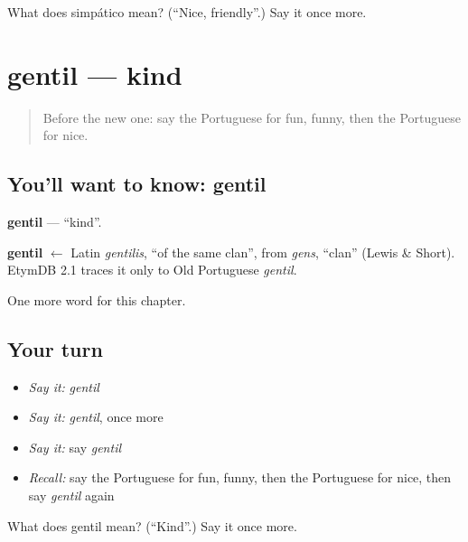 \begin{tcolorbox}[breakable,colback=teal!4,colframe=teal!35!black,title={Before you move on}]
What does simpático mean? (\textquotedblleft{}Nice, friendly\textquotedblright{}.) Say it once more.
\end{tcolorbox}
\section[gentil]{gentil — kind}

\label{lesson:PT-C124-gentil}



\begin{quote}
Before the new one: say the Portuguese for fun, funny, then the Portuguese for nice.
\end{quote}

\subsection*{You'll want to know: gentil}
\textbf{gentil} — \textquotedblleft{}kind\textquotedblright{}.

\begin{cousinweb}
\textbf{gentil} $\leftarrow$ Latin \emph{gentilis}, \textquotedblleft{}of the same clan\textquotedblright{}, from \emph{gens}, \textquotedblleft{}clan\textquotedblright{} (Lewis \& Short). EtymDB 2.1 traces it only to Old Portuguese \emph{gentil}.
\end{cousinweb}

\begin{grammarlens}[title={What you've built}]
One more word for this chapter.
\end{grammarlens}

\subsection*{Your turn}
\begin{itemize}
\raggedright
  \item \emph{Say it:} \emph{gentil}
  \item \emph{Say it:} \emph{gentil}, once more
  \item \emph{Say it:} say \emph{gentil}
  \item \emph{Recall:} say the Portuguese for fun, funny, then the Portuguese for nice, then say \emph{gentil} again
\end{itemize}

\begin{tcolorbox}[breakable,colback=teal!4,colframe=teal!35!black,title={Before you move on}]
What does gentil mean? (\textquotedblleft{}Kind\textquotedblright{}.) Say it once more.
\end{tcolorbox}
